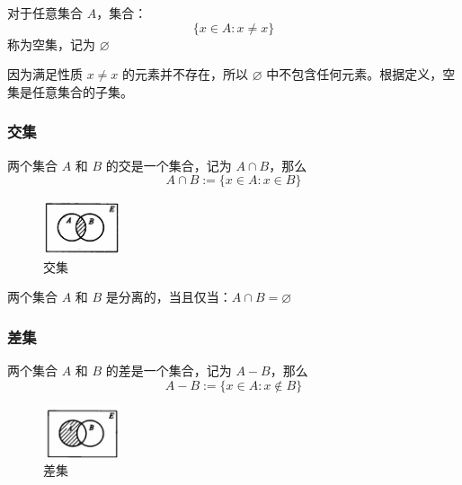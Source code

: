 \begin{definition}[空集 Empty ]
    对于任意集合 $ A $，集合：
    \[
        \{x\in A:x\neq x\} 
    \]
    称为空集，记为 $ \varnothing $
\end{definition}

\begin{note}
因为满足性质 $ x\neq x $ 的元素并不存在，所以 $ \varnothing $ 中不包含任何元素。根据定义，空集是任意集合的子集。
\end{note}

\subsubsection{交集}
\begin{definition}[交集 Intersection]
    两个集合 $ A $ 和 $ B $ 的交是一个集合，记为 $ A\cap  B $，那么
    \[
        A\cap B := \{x\in A : x\in B\} 
    \]
\end{definition}

\begin{figure}[htbp]
    \centering
    \includegraphics[width=0.2\textwidth]{figures/chapter1/chapter1_1} 
    \caption{交集}
    \label{fig:chapter1_1}
\end{figure}

\begin{definition}[分离 Disjoint]
    两个集合 $ A $ 和 $ B $ 是分离的，当且仅当：$ A\cap B = \varnothing $
\end{definition}

\subsubsection{差集}

\begin{definition}[差集 Difference]
    两个集合 $ A $ 和 $ B $ 的差是一个集合，记为 $ A-  B $，那么
    \[
        A-  B := \{x\in A:x\notin B\}
    \]
\end{definition}

\begin{figure}[htbp]
    \centering
    \includegraphics[width=0.2\textwidth]{figures/chapter1/chapter1_2} 
    \caption{差集}
    \label{fig:chapter1_2}
\end{figure}

